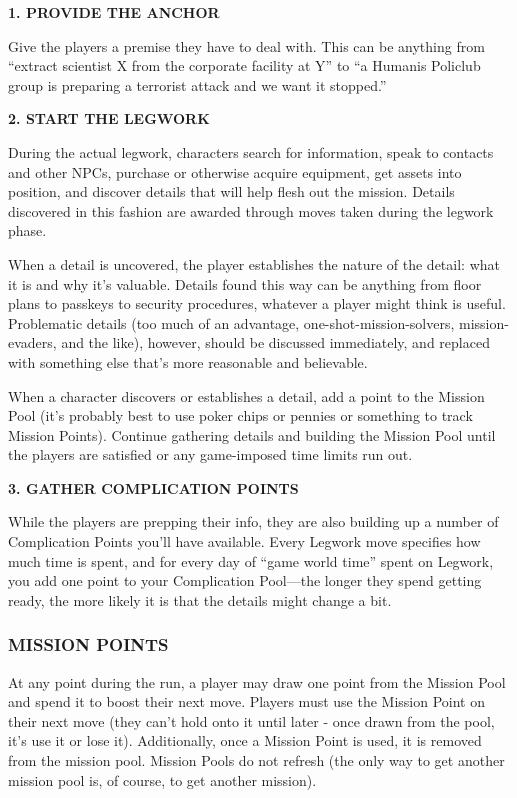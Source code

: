 \documentclass[oneside,10pt]{article}
\begin{document}
\begin{multicols}{2}
  \textbf{1.  PROVIDE THE ANCHOR}

  Give the players a premise they have to deal with. This can be
  anything from ``extract scientist X from the corporate facility at
  Y'' to ``a Humanis Policlub group is preparing a terrorist attack
  and we want it stopped.''

  \textbf{2.  START THE LEGWORK}

  During the actual legwork, characters search for information, speak
  to contacts and other NPCs, purchase or otherwise acquire equipment,
  get assets into position, and discover details that will help flesh
  out the mission. Details discovered in this fashion are awarded
  through moves taken during the legwork phase.

  When a detail is uncovered, the player establishes the nature of the
  detail: what it is and why it’s valuable.  Details found this way
  can be anything from floor plans to passkeys to security procedures,
  whatever a player might think is useful. Problematic details (too
  much of an advantage, one-shot-mission-solvers, mission-evaders, and
  the like), however, should be discussed immediately, and replaced
  with something else that’s more reasonable and believable.

  When a character discovers or establishes a detail, add a point to
  the Mission Pool (it’s probably best to use poker chips or pennies
  or something to track Mission Points). Continue gathering details
  and building the Mission Pool until the players are satisfied or any
  game-imposed time limits run out.

  \textbf{3.  GATHER COMPLICATION POINTS}

  While the players are prepping their info, they are also building up
  a number of Complication Points you’ll have available. Every Legwork
  move specifies how much time is spent, and for every day of ``game
  world time'' spent on Legwork, you add one point to your
  Complication Pool—the longer they spend getting ready, the more
  likely it is that the details might change a bit.

  \subsubsection{MISSION POINTS}
  At any point during the run, a player may draw one point from the
  Mission Pool and spend it to boost their next move.  Players must
  use the Mission Point on their next move (they can’t hold onto it
  until later - once drawn from the pool, it’s use it or lose
  it). Additionally, once a Mission Point is used, it is removed from
  the mission pool. Mission Pools do not refresh (the only way to get
  another mission pool is, of course, to get another mission).


\end{multicols}
\end{document}
